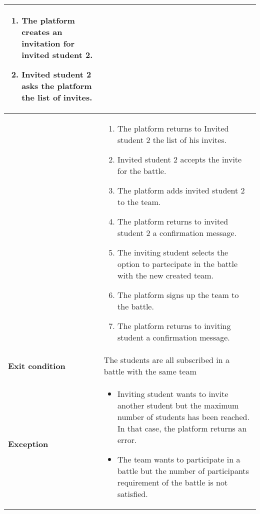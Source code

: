 \begin{enumerate}[label=\textbf{UC\arabic*}:,ref=UC\arabic*,leftmargin=1.3cm]
{\begin{longtable}{|l|p{11.9cm}|}
\begin{enumerate}[label=\arabic*.]
                        \item The platform creates an invitation for invited student 2.
                        \item Invited student 2 asks the platform the list of invites.
                              \setcounter{resumeEnumeration}{\value{enumii}}
                  \end{enumerate}          \\\hline
                                           &
                  \begin{enumerate}[label=\arabic*.]
                        \setcounter{enumii}{\value{resumeEnumeration}}
                        \item The platform returns to Invited student 2 the list of his invites.
                        \item Invited student 2 accepts the invite for the battle.
                        \item The platform adds invited student 2 to the team.
                        \item The platform returns to invited student 2 a confirmation message.
                        \item The inviting student selects the option to partecipate in the battle with the new created team.
                        \item The platform signs up the team to the battle.
                        \item The platform returns to inviting student a confirmation message.
                  \end{enumerate}                                                 \\\hline
                  \textbf{Exit condition}  & The students are all subscribed in a battle with the same team                                                            \\\hline
                  \textbf{Exception}       & \begin{itemize}
                                                   \item Inviting student wants to invite another student but the maximum number of students has been reached.
                                                         In that case, the platform returns an error.
                                                   \item The team wants to participate in a battle but the number of participants requirement of the battle is not satisfied.

\end{itemize}
\end{longtable}}
\end{enumerate}
